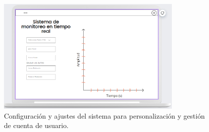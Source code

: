 \begin{figure}[h]
\centering
\includegraphics[width=0.8\textwidth]{img/prototipo_interfaz/5.png}
\caption{Configuración y ajustes del sistema para personalización y gestión de cuenta de usuario.}
\label{fig:configuracion}
\end{figure}

